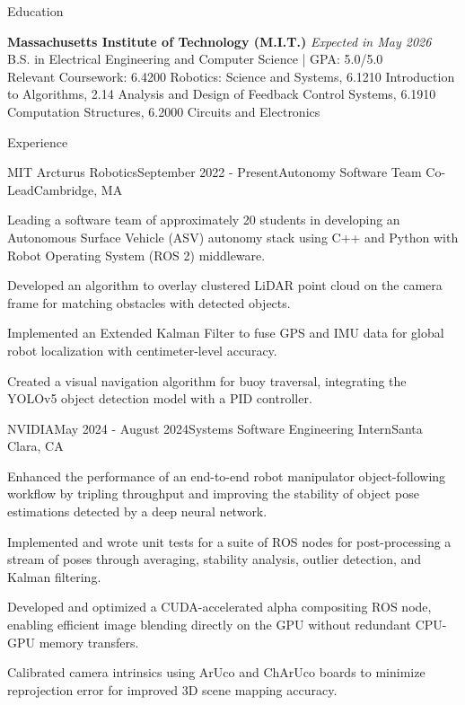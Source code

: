 \documentclass[
	10pt,
]{resume}
\begin{document}
\begin{rSection}{Education}

	\textbf{Massachusetts Institute of Technology (M.I.T.)} \hfill \textit{Expected in May 2026} \\ 
	B.S. in Electrical Engineering and Computer Science | GPA: 5.0/5.0 \\
    Relevant Coursework: 6.4200 Robotics: Science and Systems, 6.1210 Introduction to Algorithms, 2.14 Analysis and Design of Feedback Control Systems, 6.1910 Computation Structures, 6.2000 Circuits and Electronics
\end{rSection}

\begin{rSection}{Experience}

	\begin{rSubsection}{MIT Arcturus Robotics}{September 2022 - Present}{Autonomy Software Team Co-Lead}{Cambridge, MA}
    \item Leading a software team of approximately 20 students in developing an Autonomous Surface Vehicle (ASV) autonomy stack using C++ and Python with Robot Operating System (ROS 2) middleware.
    \item Developed an algorithm to overlay clustered LiDAR point cloud on the camera frame for matching obstacles with detected objects.
    \item Implemented an Extended Kalman Filter to fuse GPS and IMU data for global robot localization with centimeter-level accuracy.
    \item Created a visual navigation algorithm for buoy traversal, integrating the YOLOv5 object detection model with a PID controller.
    \end{rSubsection}

	\begin{rSubsection}{NVIDIA}{May 2024 - August 2024}{Systems Software Engineering Intern}{Santa Clara, CA}
    \item Enhanced the performance of an end-to-end robot manipulator object-following workflow by tripling throughput and improving the stability of object pose estimations detected by a deep neural network.
    \item Implemented and wrote unit tests for a suite of ROS nodes for post-processing a stream of poses through averaging, stability analysis, outlier detection, and Kalman filtering.
    \item Developed and optimized a CUDA-accelerated alpha compositing ROS node, enabling efficient image blending directly on the GPU without redundant CPU-GPU memory transfers.
    \item Calibrated camera intrinsics using ArUco and ChArUco boards to minimize reprojection error for improved 3D scene mapping accuracy.
    \end{rSubsection}


\end{rSection}
\end{document}
